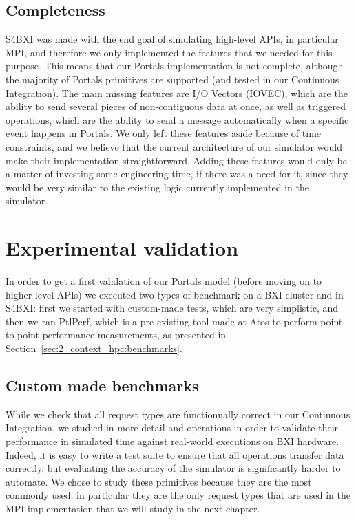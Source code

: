 \subsection{Completeness}

S4BXI was made with the end goal of simulating high-level APIs, in particular
MPI, and therefore we only implemented the features that we needed for this
purpose. This means that our Portals implementation is not complete, although
the majority of Portals primitives are supported (and tested in our Continuous
Integration). The main missing features are I/O Vectors (IOVEC), which are the
ability to send several pieces of non-contiguous data at once, as well as
triggered operations, which are the ability to send a message automatically when
a specific event happens in Portals. We only left these features aside because
of time constraints, and we believe that the current architecture of our
simulator would make their implementation straightforward. Adding these features
would only be a matter of investing some engineering time, if there was a need
for it, since they would be very similar to the existing logic currently
implemented in the simulator.

\section{Experimental validation}
\label{sec:4_portals:validation}

In order to get a first validation of our Portals model (before moving on to
higher-level APIs) we executed two types of benchmark on a BXI cluster and in
S4BXI: first we started with custom-made tests, which are very simplistic, and
then we ran PtlPerf, which is a pre-existing tool made at Atos to perform
point-to-point performance measurements, as presented in
Section~\ref{sec:2_context_hpc:benchmarks}.

\subsection{Custom made benchmarks}

While we check that all request types are functionnally correct in our
Continuous Integration, we studied in more detail  and
 operations in order to validate their performance in simulated
time against real-world executions on BXI hardware. Indeed, it is easy to write
a test suite to ensure that all operations transfer data correctly, but
evaluating the accuracy of the simulator is significantly harder to automate. We
chose to study these primitives because they are the most commonly used, in
particular they are the only request types that are used in the MPI
implementation that we will study in the next chapter.


